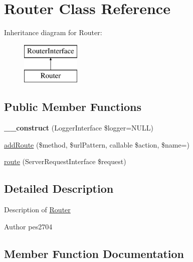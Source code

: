 \hypertarget{class_pes_1_1_router_1_1_router}{}\section{Router Class Reference}
\label{class_pes_1_1_router_1_1_router}
Inheritance diagram for Router\+:\begin{figure}[H]
\begin{center}
\leavevmode
\includegraphics[height=2.000000cm]{class_pes_1_1_router_1_1_router}
\end{center}
\end{figure}
\subsection*{Public Member Functions}
\begin{DoxyCompactItemize}
\item 
\mbox{\label{class_pes_1_1_router_1_1_router_a4d086b03f47931c183f0414bf2da5103}} 
{\bfseries \+\_\+\+\_\+construct} (Logger\+Interface \$logger=N\+U\+LL)
\item 
\mbox{\hyperlink{class_pes_1_1_router_1_1_router_ae93c78e32bf28f47fa150a7278b71519}{add\+Route}} (\$method, \$url\+Pattern, callable \$action, \$name=\textquotesingle{}\textquotesingle{})
\item 
\mbox{\hyperlink{class_pes_1_1_router_1_1_router_aa6b44d5906fa3d97b3c9bd94a92df045}{route}} (Server\+Request\+Interface \$request)
\end{DoxyCompactItemize}


\subsection{Detailed Description}
Description of \mbox{\hyperlink{class_pes_1_1_router_1_1_router}{Router}}

\begin{DoxyAuthor}{Author}
pes2704 
\end{DoxyAuthor}


\subsection{Member Function Documentation}
\mbox{\label{class_pes_1_1_router_1_1_router_ae93c78e32bf28f47fa150a7278b71519}} 

